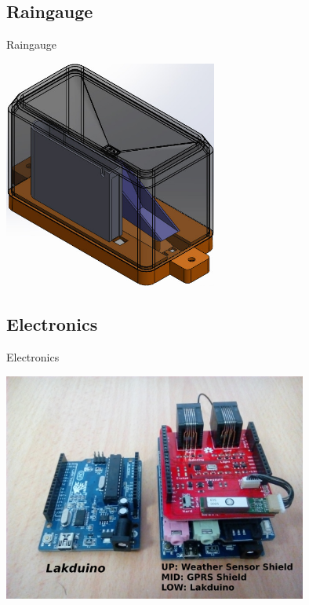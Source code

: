 \documentclass[xcolor=dvipsnames,beamer]{beamer} %
\begin{document}
\subsection{Raingauge}
\begin{frame}[fragile]{Raingauge}

\begin{center}
 \includegraphics[width=7cm]{MWSv1_rain1}
\end{center}

\end{frame}

\subsection{Electronics}
\begin{frame}[fragile]{Electronics}

\begin{center}
 \includegraphics[width=10cm]{MWSv1_annotated}
\end{center}

\end{frame}
\end{document}
